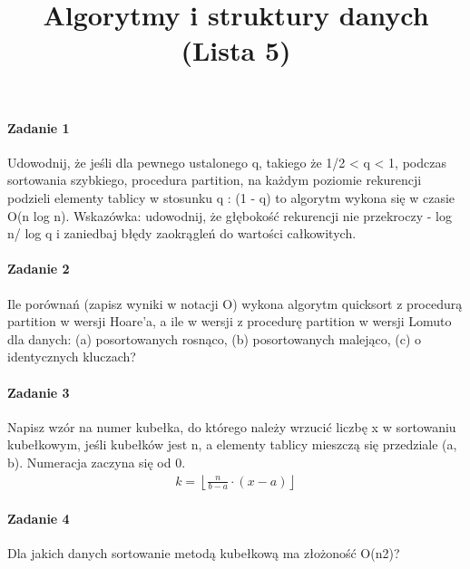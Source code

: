 \documentclass[18pt]{extarticle}
\begin{document}
\large
{}\selectfont

\title{Algorytmy i struktury danych (Lista 5)}
\date{}
\maketitle

\paragraph{Zadanie 1} Udowodnij, że jeśli dla pewnego ustalonego q, takiego że 1/2 < q < 1, podczas sortowania szybkiego, procedura partition, na każdym poziomie rekurencji podzieli elementy tablicy w stosunku q : (1 - q) to algorytm wykona się w czasie O(n log n). Wskazówka: udowodnij, że głębokość rekurencji nie przekroczy - log n/ log q i zaniedbaj błędy zaokrągleń do wartości całkowitych.

\paragraph{Zadanie 2} Ile porównań (zapisz wyniki w notacji O) wykona algorytm quicksort z procedurą partition w wersji Hoare’a, a ile w wersji z procedurę partition w wersji Lomuto dla danych: (a) posortowanych rosnąco, (b) posortowanych malejąco, (c) o identycznych kluczach?

\paragraph{Zadanie 3} Napisz wzór na numer kubełka, do którego należy wrzucić liczbę x w sortowaniu kubełkowym, jeśli kubełków jest n, a elementy tablicy mieszczą się przedziale (a, b). Numeracja zaczyna się od 0. \\


\begin{align*}
    k = \left \lfloor \frac{n}{b - a} \cdot (x - a) \right \rfloor
\end{align*}

\paragraph{Zadanie 4} Dla jakich danych sortowanie metodą kubełkową ma złożoność O(n2)? \\
\end{document}
